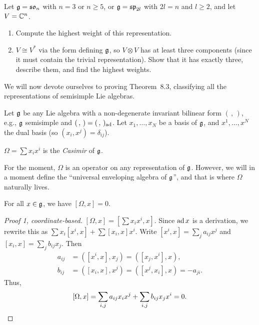 \begin{exercise}
Let $\mathfrak{g} = \mathfrak{so}_n$ with $n = 3$ or $n \geq 5$, or $\mathfrak{g} = \mathfrak{sp}_{2l}$ with $2l = n$
and $l \geq 2$, and let $V = \mathbb{C}^n$.
\begin{enumerate}
  \item Compute the highest weight of this representation.
  \item $V \cong V^*$ via the form defining $\mathfrak{g}$, so $V \otimes V$ has at least
    three components (since it must contain the trivial representation). Show
    that it has exactly three, describe them, and find the highest weights.
\end{enumerate}
\end{exercise}

We will now devote ourselves to proving Theorem~8.3, classifying all the
representations of semisimple Lie algebras.

Let $\mathfrak{g}$ be any Lie algebra with a non-degenerate invariant bilinear form
$(\,,\,)$, e.g., $\mathfrak{g}$ semisimple and $(\,,\,) = (\,,\,)_{\operatorname{ad}}$. Let
$x_1, \dots, x_N$ be a basis of $\mathfrak{g}$, and $x^1, \dots, x^N$ the dual basis (so
$(x_i, x^j) = \delta_{ij}$).

\begin{definition}
$\Omega = \sum x_ix^i$ is the \emph{Casimir} of $\mathfrak{g}$.
\end{definition}

\begin{remark}
For the moment, $\Omega$ is an operator on any representation of $\mathfrak{g}$.
However, we will in a moment define the ``universal enveloping algebra of
$\mathfrak{g}$'', and that is where $\Omega$ naturally lives.
\end{remark}

\begin{lemma}
For all $x \in \mathfrak{g}$, we have $[\Omega, x] = 0$.
\end{lemma}

\begin{proof}[Proof 1, coordinate-based]
$[\Omega, x] = [\sum x_ix^i, x]$. Since $\operatorname{ad} x$ is a derivation, we rewrite
this as $\sum x_i[x^i, x] + \sum [x_i, x]x^i$. Write
$[x^i, x] = \sum_j a_{ij}x^j$ and $[x_i, x] = \sum_j b_{ij}x_j$. Then
\begin{align*}
  a_{ij} &= ([x^i, x], x_j) = ([x_j, x^i], x),\\
  b_{ij} &= ([x_i, x], x^j) = ([x^j, x_i], x) = -a_{ji}.
\end{align*}
Thus,
\[
  [\Omega, x] = \sum_{i,j} a_{ij}x_ix^j + \sum_{i,j} b_{ij}x_jx^i = 0. \qedhere
\]
\end{proof}

